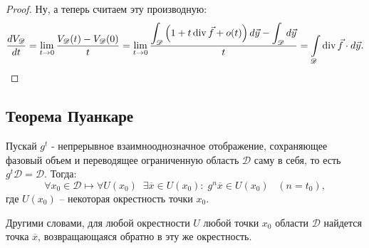 \begin{proof}
		Ну, а теперь считаем эту производную:
		\begin{equation*}
			\frac{dV_\mathscr{D}}{dt} = \lim\limits_{t \rightarrow 0} \frac{V_\mathscr{D}(t) - 	V_\mathscr{D}(0)}{t} = \lim\limits_{t \rightarrow 0} \dfrac{\displaystyle \int_{\mathscr{D}} \left(1 + t\operatorname{div}\vec{f} + o(t)\right) d\vec{y} - \int_{\mathscr{D}} d\vec{y}}{t} = \int\limits_{\mathscr{D}} \operatorname{div}\vec{f}\cdot d\vec{y}.
		\end{equation*}
	\end{proof}

	\subsection{Теорема Пуанкаре}
	Пускай $g^t$ - непрерывное взаимнооднозначное отображение, сохраняющее фазовый объем и переводящее ограниченную область $\mathscr{D}$ саму в себя, то есть $g^t\mathscr{D} = \mathscr{D}$. Тогда:
	\begin{equation*}
		\forall x_0 \in \mathscr{D} \longmapsto \forall U(x_0) \;\; \exists \overline{x} \in U(x_0):\; g^n \overline{x} \in U(x_0) \;\;\; (n = t_0),
	\end{equation*}
	где $U(x_0)$ -- некоторая окрестность точки $x_0$.
	
	Другими словами, для любой окрестности $U$ любой точки $x_0$ области $\mathscr{D}$ найдется точка $\overline{x}$, возвращающаяся обратно в эту же окрестность.
	
